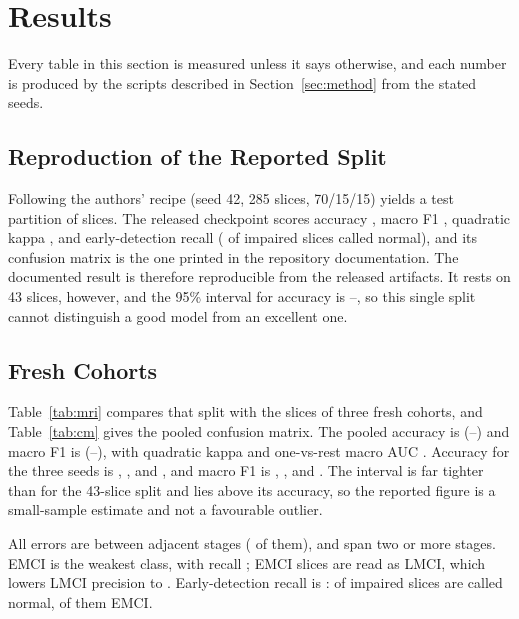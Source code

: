 \documentclass[conference]{IEEEtran}
\begin{document}
\section{Results}
\label{sec:results}
Every table in this section is measured unless it says otherwise, and each number is produced by the scripts described in Section~\ref{sec:method} from the stated seeds.

\subsection{Reproduction of the Reported Split}
Following the authors' recipe (seed 42, 285 slices, 70/15/15) yields a test partition of \EOneN{} slices. The released checkpoint scores accuracy \EOneAcc{}, macro F1 \EOneFone{}, quadratic kappa \EOneKappa{}, and early-detection recall \EOneEarly{} (\EOneMissed{} of \EOneImpaired{} impaired slices called normal), and its confusion matrix is \EOneCmMatches{} the one printed in the repository documentation. The documented result is therefore reproducible from the released artifacts. It rests on 43 slices, however, and the 95\% interval for accuracy is \EOneAccLo--\EOneAccHi, so this single split cannot distinguish a good model from an excellent one.

\subsection{Fresh Cohorts}
Table~\ref{tab:mri} compares that split with the \PoolN{} slices of three fresh cohorts, and Table~\ref{tab:cm} gives the pooled confusion matrix. The pooled accuracy is \PoolAcc{} (\PoolAccLo--\PoolAccHi) and macro F1 is \PoolFone{} (\PoolFoneLo--\PoolFoneHi), with quadratic kappa \PoolKappa{} and one-vs-rest macro AUC \PoolAuc{}. Accuracy for the three seeds is \AccA{}, \AccB{}, and \AccC{}, and macro F1 is \FoneA{}, \FoneB{}, and \FoneC{}. The interval is far tighter than for the 43-slice split and lies above its accuracy, so the reported figure is a small-sample estimate and not a favourable outlier.



All \PoolWrong{} errors are between adjacent stages (\PoolAdjErr{} of them), and \PoolFarErr{} span two or more stages. EMCI is the weakest class, with recall \PoolEmciRecall{}; \PoolEmciLmci{} EMCI slices are read as LMCI, which lowers LMCI precision to \PoolLmciPrec{}. Early-detection recall is \PoolEarly{}: \PoolMissedImpaired{} of \PoolImpaired{} impaired slices are called normal, \PoolEmciNc{} of them EMCI.
\end{document}
